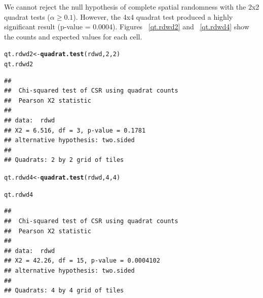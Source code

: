 \documentclass{article}\usepackage[]{graphicx}\usepackage[]{color}
\makeatletter
\newcommand{\hlnum}[1]{\textcolor[rgb]{0.686,0.059,0.569}{#1}}%
\newcommand{\hlstd}[1]{\textcolor[rgb]{0.345,0.345,0.345}{#1}}%
\newcommand{\hlkwb}[1]{\textcolor[rgb]{0.69,0.353,0.396}{#1}}%
\newcommand{\hlkwd}[1]{\textcolor[rgb]{0.737,0.353,0.396}{\textbf{#1}}}%
\newenvironment{kframe}{%
 \def\at@end@of@kframe{}%
 \ifinner\ifhmode%
  \def\at@end@of@kframe{\end{minipage}}%
  \begin{minipage}{\columnwidth}%
 \fi\fi%
 \def\FrameCommand##1{\hskip\@totalleftmargin \hskip-\fboxsep
 \colorbox{shadecolor}{##1}\hskip-\fboxsep
     \hskip-\linewidth \hskip-\@totalleftmargin \hskip\columnwidth}%
 \MakeFramed {\advance\hsize-\width
   \@totalleftmargin\z@ \linewidth\hsize
   \@setminipage}}%
 {\par\unskip\endMakeFramed%
 \at@end@of@kframe}
\newenvironment{knitrout}{}{} %
\makeatother
\begin{document}
We cannot reject the null hypothesis of complete spatial randomness with the 2x2 quadrat tests ($\alpha \geq 0.1$).  However, the 4x4 quadrat test produced a highly significant result (p-value = 0.0004). Figures ~\ref{qt.rdwd2} and ~\ref{qt.rdwd4} show the counts and expected values for each cell.\\
\begin{knitrout}
\color{fgcolor}\begin{kframe}
\begin{alltt}
\hlstd{qt.rdwd2}\hlkwb{<-}\hlkwd{quadrat.test}\hlstd{(rdwd,}\hlnum{2}\hlstd{,}\hlnum{2}\hlstd{)}
\hlstd{qt.rdwd2}
\end{alltt}
\begin{verbatim}
## 
## 	Chi-squared test of CSR using quadrat counts
## 	Pearson X2 statistic
## 
## data:  rdwd
## X2 = 6.516, df = 3, p-value = 0.1781
## alternative hypothesis: two.sided
## 
## Quadrats: 2 by 2 grid of tiles
\end{verbatim}
\begin{alltt}
\hlstd{qt.rdwd4}\hlkwb{<-}\hlkwd{quadrat.test}\hlstd{(rdwd,}\hlnum{4}\hlstd{,}\hlnum{4}\hlstd{)}
\end{alltt}


{\ttfamily\noindent{}}\begin{alltt}
\hlstd{qt.rdwd4}
\end{alltt}
\begin{verbatim}
## 
## 	Chi-squared test of CSR using quadrat counts
## 	Pearson X2 statistic
## 
## data:  rdwd
## X2 = 42.26, df = 15, p-value = 0.0004102
## alternative hypothesis: two.sided
## 
## Quadrats: 4 by 4 grid of tiles
\end{verbatim}
\end{kframe}
\end{knitrout}
\end{document}

